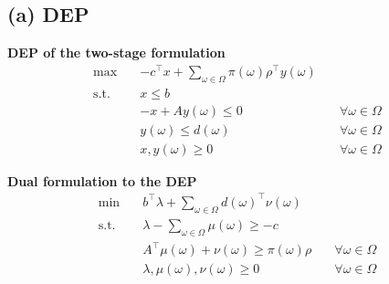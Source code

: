 \documentclass[8pt]{article}
\begin{document}
\subsection*{(a) DEP}
\noindent

\begin{minipage}[t]{0.48\textwidth}
    \textbf{DEP of the two-stage formulation}
    \begin{subequations}
        \begin{align}
            \max \quad & -c^\top x + \sum_{\omega \in \Omega} \pi(\omega) \rho^\top y(\omega) \\
            \text{s.t.} \quad
                       & x \leq b                                                             \\
                       & -x + Ay(\omega) \leq 0
                       & \quad \forall \omega \in \Omega                                      \\
                       & y(\omega) \leq d(\omega)
                       & \quad \forall \omega \in \Omega                                      \\
                       & x, y(\omega) \geq 0
                       & \quad \forall \omega \in \Omega
        \end{align}
    \end{subequations}
\end{minipage}
\hfill
\begin{minipage}[t]{0.48\textwidth}
    \textbf{Dual formulation to the DEP}
    \begin{subequations}
        \begin{align}
            \min \quad & b^\top \lambda + \sum_{\omega \in \Omega} d(\omega)^\top \nu(\omega) \\
            \text{s.t.} \quad
                       & \lambda - \sum_{\omega \in \Omega} \mu(\omega) \geq -c               \\
                       & A^\top \mu(\omega) + \nu(\omega) \geq \pi(\omega) \rho
                       & \quad \forall \omega \in \Omega                                      \\
                       & \lambda, \mu(\omega), \nu(\omega) \geq 0
                       & \quad \forall \omega \in \Omega
        \end{align}
    \end{subequations}
\end{minipage}

\vspace{0.6cm}
\end{document}
